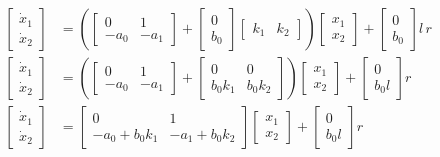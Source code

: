 \documentclass[a4paper, 10pt, ]{article}
\begin{document}
\begin{align}
    \begin{bmatrix} \dot x_1 \\ \dot x_2 \end{bmatrix}
    &=
    \left(
        \begin{bmatrix} 0 & 1 \\ -a_0 & -a_1 \end{bmatrix}
         +
         \begin{bmatrix} 0 \\ b_0 \end{bmatrix}
         \begin{bmatrix} k_1 & k_2 \end{bmatrix}
    \right)
    \begin{bmatrix} x_1  \\ x_2 \end{bmatrix}
    +
    \begin{bmatrix} 0  \\ b_0 \end{bmatrix}
    l \, r
    \\
    \begin{bmatrix} \dot x_1 \\ \dot x_2 \end{bmatrix}
    &=
    \left(
        \begin{bmatrix} 0 & 1 \\ -a_0 & -a_1 \end{bmatrix}
         +
         \begin{bmatrix} 0 & 0 \\ b_0 k_1 & b_0 k_2 \end{bmatrix}
    \right)
    \begin{bmatrix} x_1  \\ x_2 \end{bmatrix}
    +
    \begin{bmatrix} 0  \\ b_0 l \end{bmatrix}
    r
    \\
    \begin{bmatrix} \dot x_1 \\ \dot x_2 \end{bmatrix}
    &=
    \begin{bmatrix} 0 & 1 \\ -a_0 + b_0 k_1 & -a_1 + b_0 k_2 \end{bmatrix}
    \begin{bmatrix} x_1  \\ x_2 \end{bmatrix}
    +
    \begin{bmatrix} 0  \\ b_0 l \end{bmatrix}
    r
    \label{RAWstavopisURO2r}
\end{align}
\end{document}
